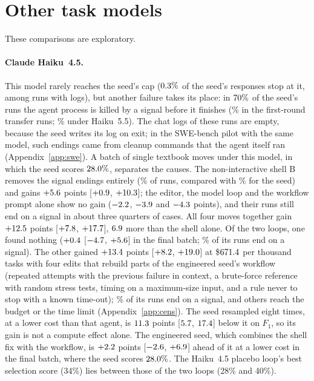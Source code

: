 \section{Other task models}\label{app:othermodels}
These comparisons are exploratory.
\paragraph{Claude Haiku~4.5.} This model rarely reaches the seed's cap ($0.3\%$ of the seed's responses stop at
it, among runs with logs), but another failure takes its place: in $70\%$ of the seed's runs the agent process is killed by a signal
before it finishes (\vsigKSeedTr\% in the first-round transfer runs; \vsigHSeed\% under Haiku~5.5). The chat logs
of these runs are empty, because the seed writes its log on exit; in the SWE-bench pilot with the same model, such
endings came from cleanup commands that the agent itself ran (Appendix~\ref{app:swe}). A batch of single textbook moves under this
model, in which the seed scores $28.0\%$, separates the causes. The non-interactive shell B removes the signal endings
entirely (\vkgBSig\% of runs, compared with \vkgNoneSig\% for the seed) and gains $+5.6$ points [$+0.9$,
$+10.3$]; the editor, the model loop and the workflow prompt alone show no gain ($-2.2$, $-3.9$ and
$-4.3$ points), and their runs still end on a signal in about three quarters of cases. All four moves together gain
$+12.5$ points [$+7.8$, $+17.7$], $6.9$ more than the shell alone. Of the two
loops, one found nothing ($+0.4$ [$-4.7$, $+5.6$] in the final batch; \vsigKOne\% of its runs end
on a signal). The other gained $+13.4$ points [$+8.2$, $+19.0$] at \$$671.4$ per thousand tasks
with four edits that rebuild parts of the engineered seed's workflow (repeated attempts with the previous failure in
context, a brute-force reference with random stress tests, timing on a maximum-size input, and a rule never to stop with
a known time-out); \vsigKTwo\% of its runs end on a signal, and others reach the budget or the time limit
(Appendix~\ref{app:cens}). The seed resampled eight times, at a lower cost than that agent, is $11.3$ points
[$5.7$, $17.4$] below it on $F_1$, so its gain is not a compute effect alone.
The engineered seed, which combines the shell fix with the workflow, is $+2.2$ points
[$-2.6$, $+6.9$] ahead of it at a lower cost in the final batch, where the seed scores $28.0\%$. The Haiku~4.5
placebo loop's best selection score (34\%) lies between those of the two loops (28\% and 40\%).

